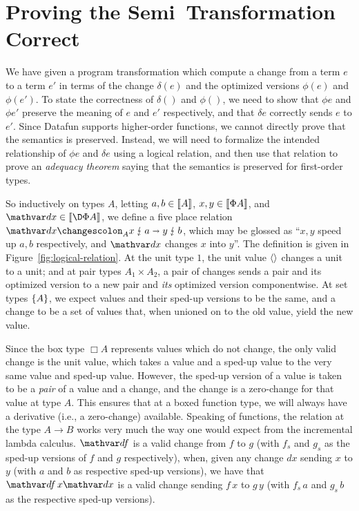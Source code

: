 \section{Proving the Semi\naive\ Transformation Correct}

We have given a program transformation which compute a change from a
term $e$ to a term $e'$ in terms of the change $\delta(e)$ and the
optimized versions $\phi(e)$ and $\phi(e')$. To state the correctness
of $\delta()$ and $\phi()$, we need to show that $\phi e$ and
$\phi e'$ preserve the meaning of $e$ and $e'$ respectively, and that
$\delta e$ correctly sends $e$ to $e'$.
%
Since Datafun supports higher-order functions, we cannot directly
prove that the semantics is preserved. Instead, we will need to
formalize the intended relationship of $\phi e$ and $\delta e$ using a
logical relation, and then use that relation to prove an
\emph{adequacy theorem} saying that the semantics is preserved for
first-order types.

So inductively on types $A$, letting $a,b \in \llbracket{A}\rrbracket$,
$x,y \in \llbracket{\Phi A}\rrbracket$, and $\dx \in \den{\DP A}$, we define a five
place relation $\weirdat{A}{\dx}{x}{a}{y}{b}$, which may be glossed as
``$x,y$ speed up $a,b$ respectively, and $\dx$ changes $x$ into $y$''.
The definition is given in Figure~\ref{fig:logical-relation}. At the
unit type  $1$, the unit value $\langle{}\rangle$ changes a unit to a unit; and at pair
types $A_1 \times A_2$, a pair of changes sends a pair and its optimized version to
a new pair and \emph{its} optimized version componentwise. At set
types $\{{A}\}$, we expect values and their sped-up versions to be the same,
and a change to be a set of values that, when unioned on to the
old value, yield the new value.

Since the box type $\Box A$ represents values which do not change, the
only valid change is the unit value, which takes a value and a sped-up
value to the very same value and sped-up value. However, the sped-up
version of a value is taken to be a \emph{pair} of a value and a
change, and the change is a zero-change for that value at type $A$.
This ensures that at a boxed function type, we will always have a
derivative (i.e., a zero-change) available. 
%
Speaking of functions, the relation at the type $A \to B$ works very
much the way one would expect from the incremental lambda calculus.
$\df$ is a valid change from $f$ to $g$ (with $f_s$ and $g_s$ as the
sped-up versions of $f$ and $g$ respectively), when, given any
change $dx$ sending $x$ to $y$ (with $a$ and $b$ as respective sped-up
versions), we have that $\df\,x\dx$ is a valid change sending
$f\,x$ to $g\,y$ (with $f_s\,a$ and $g_s\,b$ as the respective
sped-up versions). 

